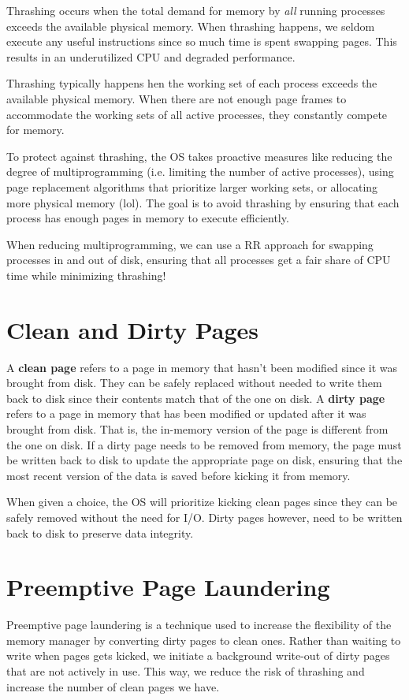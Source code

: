 \documentclass{report}
\newcommand{\definitionBegin}[1]{\begin{tcolorbox}[title={Definition: #1}]}
\newcommand{\definitionEnd}{\end{tcolorbox}}
\newcommand{\exampleBegin}[1]{\begin{tcolorbox}[colback=blue!5!white,colframe=black!75!blue,title={Example:
      #1}]}
\newcommand{\exampleEnd}{\end{tcolorbox}}
\begin{document}
Thrashing occurs when the total demand for memory by \textit{all} running processes exceeds the
available physical memory. When thrashing happens, we seldom execute any useful instructions since
so much time is spent swapping pages. This results in an underutilized CPU and degraded performance.

Thrashing typically happens hen the working set of each process exceeds the available physical
memory. When there are not enough page frames to accommodate the working sets of all active
processes, they constantly compete for memory.

To protect against thrashing, the OS takes proactive measures like reducing the degree of
multiprogramming (i.e. limiting the number of active processes), using page replacement algorithms
that prioritize larger working sets, or allocating more physical memory (lol). The goal is to avoid
thrashing by ensuring that each process has enough pages in memory to execute efficiently.

\exampleBegin{Everyone Gets a Turn}
When reducing multiprogramming, we can use a RR approach for swapping processes in and out of disk,
ensuring that all processes get a fair share of CPU time while minimizing thrashing!
\exampleEnd


\section{Clean and Dirty Pages}
\definitionBegin{Clean and Dirty Pages}
A \textbf{clean page} refers to a page in memory that hasn't been modified since it was brought from
disk. They can be safely replaced without needed to write them back to disk since their contents
match that of the one on disk.
\tcblower
A \textbf{dirty page} refers to a page in memory that has been modified or updated after it was
brought from disk. That is, the in-memory version of the page is different from the one on disk. If
a dirty page needs to be removed from memory, the page must be written back to disk to update the
appropriate page on disk, ensuring that the most recent version of the data is saved before kicking
it from memory. 
\definitionEnd

When given a choice, the OS will prioritize kicking clean pages since they can be safely removed
without the need for I/O. Dirty pages however, need to be written back to disk to preserve data integrity.

\section{Preemptive Page Laundering}
Preemptive page laundering is a technique used to increase the flexibility of the memory manager by
converting dirty pages to clean ones. Rather than waiting to write when pages gets kicked, we
initiate a background write-out of dirty pages that are not actively in use. This way, we reduce
the risk of thrashing and increase the number of clean pages we have.
\end{document}
